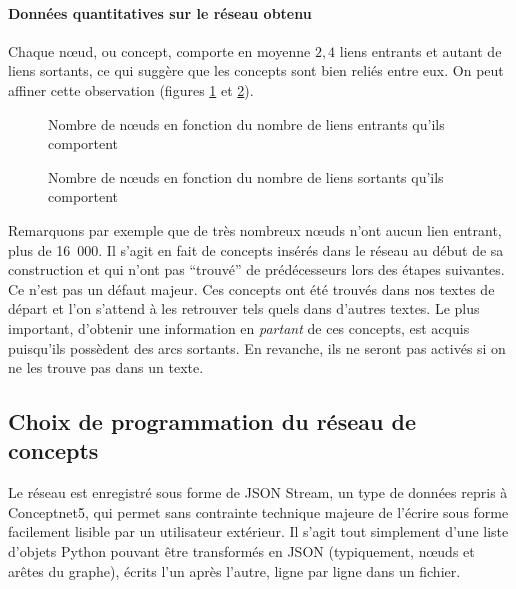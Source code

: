 \documentclass[a4paper, 12pt]{article}
\begin{document}
\paragraph{Données quantitatives sur le réseau obtenu}

Chaque n\oe{}ud, ou concept, comporte en moyenne $2,4$ liens entrants et autant de liens sortants, ce qui suggère que les concepts sont bien reliés entre eux. On peut affiner cette observation (figures \ref{fig:liens_entrants} et \ref{fig:liens_sortants}).

\begin{figure}[h]
 \centering
 \caption{Nombre de n\oe{}uds en fonction du nombre de liens entrants qu'ils comportent}
 \label{fig:liens_entrants}
\end{figure}


\begin{figure}[h]
 \centering
 \caption{Nombre de n\oe{}uds en fonction du nombre de liens sortants qu'ils comportent}
 \label{fig:liens_sortants}
\end{figure}

Remarquons par exemple que de très nombreux n\oe{}uds n'ont aucun lien entrant, plus de 16~000. Il s'agit en fait de concepts insérés dans le réseau au début de sa construction et qui n'ont pas ``trouvé'' de prédécesseurs lors des étapes suivantes. Ce n'est pas un défaut majeur. Ces concepts ont été trouvés dans nos textes de départ et l'on s'attend à les retrouver tels quels dans d'autres textes. Le plus important, d'obtenir une information en \textit{partant} de ces concepts, est acquis puisqu'ils possèdent des arcs sortants. En revanche, ils ne seront pas activés si on ne les trouve pas dans un texte.


\subsection{Choix de programmation du réseau de concepts}

Le réseau est enregistré sous forme de JSON Stream, un type de données repris à Conceptnet5, qui permet sans contrainte technique majeure de l'écrire sous forme facilement lisible par un utilisateur extérieur. Il s'agit tout simplement d'une liste d'objets Python pouvant être transformés en JSON (typiquement, n\oe{}uds et arêtes du graphe), écrits l'un après l'autre, ligne par ligne dans un fichier.\\
\end{document}
